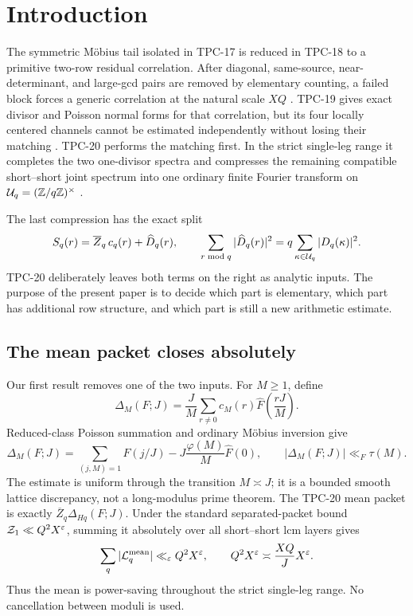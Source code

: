 \section{Introduction}
\label{sec:tpc21-introduction}

The symmetric M\"obius tail isolated in TPC-17 is reduced in TPC-18
to a primitive two-row residual correlation.  After diagonal,
same-source, near-determinant, and large-gcd pairs are removed by
elementary counting, a failed block forces a generic correlation at the
natural scale \(XQ\) \citep{WangTPC18}.  TPC-19 gives exact divisor and
Poisson normal forms for that correlation, but its four locally centered
channels cannot be estimated independently without losing their matching
\citep{WangTPC19}.  TPC-20 performs the matching first.  In the strict
single-leg range it completes the two one-divisor spectra and compresses
the remaining compatible short--short joint spectrum into one ordinary
finite Fourier transform on
\(\mathcal U_q=(\mathbb Z/q\mathbb Z)^\times\) \citep{WangTPC20}.

The last compression has the exact split
\begin{equation}
 S_q(r)=\overline Z_q\,c_q(r)+\widehat D_q(r),
 \qquad
 \sum_{r\bmod q}|\widehat D_q(r)|^2
 =q\sum_{\kappa\in\mathcal U_q}|D_q(\kappa)|^2.
 \label{eq:tpc21-intro-mean-discrepancy}
\end{equation}
TPC-20 deliberately leaves both terms on the right as analytic inputs.
The purpose of the present paper is to decide which part is elementary,
which part has additional row structure, and which part is still a new
arithmetic estimate.

\subsection{The mean packet closes absolutely}

Our first result removes one of the two inputs.  For \(M\ge1\), define
\begin{equation}
 \Delta_M(F;J)
 =\frac JM\sum_{r\ne0}c_M(r)
   \widehat F\!\left(\frac{rJ}{M}\right).
 \label{eq:tpc21-intro-delta}
\end{equation}
Reduced-class Poisson summation and ordinary M\"obius inversion give
\begin{equation}
 \Delta_M(F;J)
 =\sum_{(j,M)=1}F(j/J)
  -J\frac{\varphi(M)}M\widehat F(0),
 \qquad
 |\Delta_M(F;J)|\ll_F\tau(M).
 \label{eq:tpc21-intro-delta-bound}
\end{equation}
The estimate is uniform through the transition \(M\asymp J\); it is a
bounded smooth lattice discrepancy, not a long-modulus prime theorem.
The TPC-20 mean packet is exactly
\(\overline Z_q\Delta_{Hq}(F;J)\).  Under the standard separated-packet
bound \(\mathcal Z_1\ll Q^2X^\varepsilon\), summing it absolutely over all
short--short lcm layers gives
\begin{equation}
 \sum_q|\mathcal L_q^{\rm mean}|
 \ll_\varepsilon Q^2X^\varepsilon,
 \qquad
 Q^2X^\varepsilon\asymp\frac{XQ}{J}X^\varepsilon.
 \label{eq:tpc21-intro-mean-closure}
\end{equation}
Thus the mean is power-saving throughout the strict single-leg range.
No cancellation between moduli is used.

